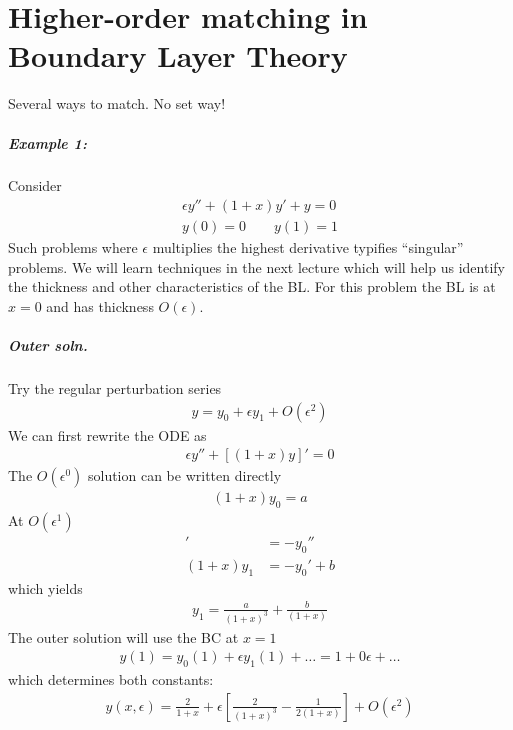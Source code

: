 \chapter[Higher order matching (BLT)]{Higher-order matching in Boundary Layer Theory}
Several ways to match. No set way!

\paragraph{Example 1:} Consider
\begin{gather}
	\epsilon y'' + (1+x)y' + y = 0 \label{eqn:wk13-ode}\\
	y(0) = 0 \qquad y(1) = 1 \nonumber
\end{gather}
Such problems where $\epsilon$ multiplies the highest derivative typifies ``singular'' problems. We will learn techniques in the next lecture which will help us identify the thickness and other characteristics of the BL. For this problem the BL is at $x=0$ and has thickness $O(\epsilon)$. 

\paragraph{Outer soln.} Try the regular perturbation series
\begin{gather*}
	y = y_0 + \epsilon y_1 + O(\epsilon^2)
\end{gather*}
We can first rewrite the ODE as
\begin{gather*}
	\epsilon y'' + [(1+x)y]' = 0
\end{gather*}
The $O(\epsilon^0)$ solution can be written directly
\begin{gather*}
	(1+x)y_0 = a
\end{gather*}
At $O(\epsilon^1)$
\begin{align*}
	[(1+x)y_1]' &= -y_0'' \\
		(1+x)y_1 &= -y_0' + b 
\end{align*}
which yields
\begin{gather*}
	y_1 = \frac{a}{(1+x)^3} + \frac{b}{(1+x)}
\end{gather*}
The outer solution will use the BC at $x=1$
\begin{gather*}
	y(1) = y_0(1) + \epsilon y_1(1) + \dots = 1 + 0\epsilon + \dots 
\end{gather*}
which determines both constants:
\begin{gather*}
	y(x,\epsilon) = \frac{2}{1+x} + \epsilon \left[\frac{2}{(1+x)^3} - \frac{1}{2(1+x)}\right] + O(\epsilon^2)
\end{gather*}
